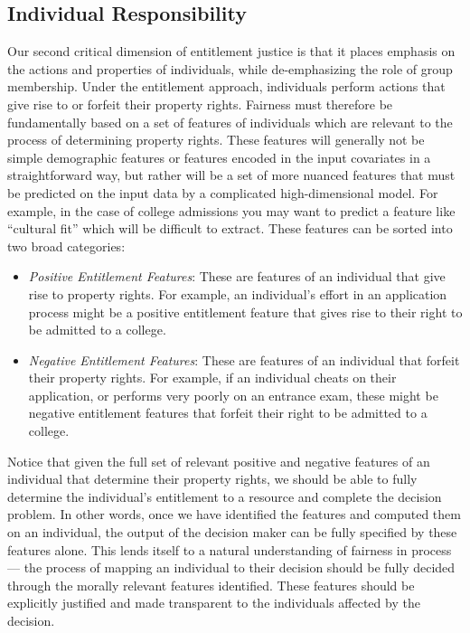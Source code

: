 \subsection{Individual Responsibility}

Our second critical dimension of entitlement justice is that it places
emphasis on the actions and properties of individuals, while de-emphasizing
the role of group membership. Under the entitlement approach, individuals
perform actions that give rise to or forfeit their property rights. Fairness
must therefore be fundamentally based on a set of features of individuals which
are relevant to the process of determining property rights. These features will
generally not be simple demographic features or features encoded in the input
covariates in a straightforward way, but rather will be a set of more nuanced
features that must be predicted on the input data by a complicated
high-dimensional model. For example, in the case of college admissions you may
want to predict a feature like ``cultural fit'' which will be difficult to
extract. These features can be sorted into two broad categories:
\begin{itemize}
    \item \emph{Positive Entitlement Features}: These are features of an
    individual that give rise to property rights. For example, an
    individual's effort in an application process might be a positive
    entitlement feature that gives rise to their right to be admitted
    to a college.
    \item \emph{Negative Entitlement Features}: These are features of an
    individual that forfeit their property rights. For example, if
    an individual cheats on their application, or performs very poorly on an
    entrance exam, these might be negative entitlement features that
    forfeit their right to be admitted to a college. 
\end{itemize}
Notice that given the full set of relevant positive and negative features of an
individual that determine their property rights, we should be able to fully
determine the individual's entitlement to a resource and complete the decision
problem. In other words, once we have identified the features and computed
them on an individual, the output of the decision maker can be fully specified
by these features alone. This lends itself to a natural understanding of
fairness in process — the process of mapping an individual to their decision
should be fully decided through the morally relevant features identified. These
features should be explicitly justified and made transparent to the
individuals affected by the decision. 


